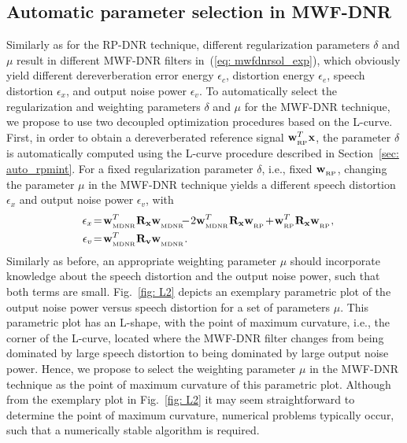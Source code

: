 \documentclass[draftcls,onecolumn,11pt]{IEEEtran}
\begin{document}
\subsection{Automatic parameter selection in MWF-DNR}
\label{sec: auto_mwf}
Similarly as for the RP-DNR technique, different regularization parameters $\delta$ and $\mu$ result in different MWF-DNR filters in~(\ref{eq: mwfdnrsol_exp}), which obviously yield different dereverberation error energy $\epsilon_c$, distortion energy $\epsilon_e$, speech distortion $\epsilon_x$, and output noise power $\epsilon_v$.
To automatically select the regularization and weighting parameters $\delta$ and $\mu$ for the MWF-DNR technique, we propose to use two decoupled optimization procedures based on the L-curve. 
First, in order to obtain a dereverberated reference signal $\mathbf{w}_{_{\rm RP}}^T\mathbf{x}$, the parameter $\delta$ is automatically computed using the L-curve procedure described in Section~\ref{sec: auto_rpmint}.
For a fixed regularization parameter $\delta$, i.e., fixed $\mathbf{w}_{_{\rm RP}}$, changing the parameter $\mu$ in the MWF-DNR technique yields a different speech distortion $\epsilon_x$ and output noise power $\epsilon_v$, with
\begin{align}
\label{eq: ex}
\!\!\!\!\!\epsilon_x & \!=\! \mathbf{w}_{_{\rm MDNR}}^T\mathbf{R}_{\mathbf{x}}\mathbf{w}_{_{\rm MDNR}}^{} \!\!\!-\! 2 \mathbf{w}^T_{_{\rm MDNR}}\mathbf{R}_{\mathbf{x}}\mathbf{w}^{}_{_{\rm RP}} \!+\! \mathbf{w}_{_{\rm RP}}^T\mathbf{R}_{\mathbf{x}}\mathbf{w}_{_{\rm RP}}^{}, \!\!\!\!\\
\label{eq: ev}
\epsilon_v &\!=\! \mathbf{w}_{_{\rm MDNR}}^T\mathbf{R}_{\mathbf{v}}\mathbf{w}_{_{\rm MDNR}}^{}. %
\end{align}
Similarly as before, an appropriate weighting parameter $\mu$ should incorporate knowledge about the speech distortion and the output noise power, such that both terms are small.
Fig.~\ref{fig: L2} depicts an exemplary parametric plot of the output noise power versus speech distortion for a set of parameters $\mu$.
This parametric plot has an L-shape, with the point of maximum curvature, i.e., the corner of the L-curve, located where the MWF-DNR filter changes from being dominated by large speech distortion to being dominated by large output noise power. 
Hence, we propose to select the weighting parameter $\mu$ in the MWF-DNR technique as the point of maximum curvature of this parametric plot.
Although from the exemplary plot in Fig.~\ref{fig: L2} it may seem straightforward to determine the point of maximum curvature, numerical problems typically occur, such that a numerically stable algorithm is required. 
\end{document}
